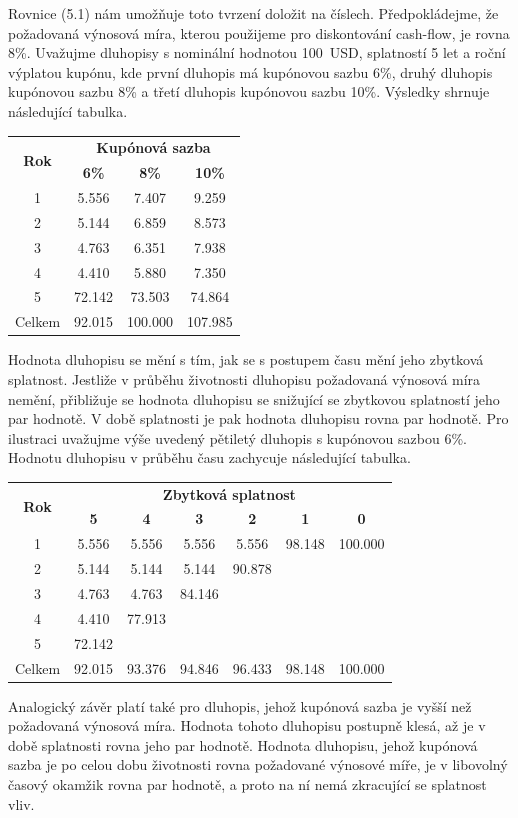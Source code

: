 \documentclass[a4paper]{book}
\begin{document}
Rovnice (5.1) nám umožňuje toto tvrzení doložit na číslech. Předpokládejme, že požadovaná výnosová míra, kterou použijeme pro diskontování cash-flow, je rovna 8\%. Uvažujme dluhopisy s nominální hodnotou 100~USD, splatností 5 let a roční výplatou kupónu, kde první dluhopis má kupónovou sazbu 6\%, druhý dluhopis kupónovou sazbu 8\% a třetí dluhopis kupónovou sazbu 10\%. Výsledky shrnuje následující tabulka.
\begin{center}
\begin{tabular}{c c c c}
\multirow{2}{*}{\textbf{Rok}} & \multicolumn{3}{c}{\textbf{Kupónová sazba}}\\
                              & \textbf{6\%} & \textbf{8\%} & \textbf{10\%}\\
\hline
1	&  5.556 &   7.407 &   9.259 \\
2	&  5.144 &   6.859 &   8.573 \\
3	&  4.763 &   6.351 &   7.938 \\
4	&  4.410 &   5.880 &   7.350 \\
5	& 72.142 &  73.503 &  74.864 \\
\hline
Celkem	& 92.015 & 100.000 & 107.985 \\

\end{tabular}
\end{center}

Hodnota dluhopisu se mění s tím, jak se s postupem času mění jeho zbytková splatnost. Jestliže v průběhu životnosti dluhopisu požadovaná výnosová míra nemění, přibližuje se hodnota dluhopisu se snižující se zbytkovou splatností jeho par hodnotě. V době splatnosti je pak hodnota dluhopisu rovna par hodnotě. Pro ilustraci uvažujme výše uvedený pětiletý dluhopis s kupónovou sazbou 6\%. Hodnotu dluhopisu v průběhu času zachycuje následující tabulka.
\begin{center}
\begin{tabular}{c c c c c c c}
\multirow{2}{*}{\textbf{Rok}} & \multicolumn{6}{c}{\textbf{Zbytková splatnost}}\\
                              & \textbf{5} & \textbf{4} & \textbf{3} & \textbf{2} & \textbf{1} & \textbf{0}\\
\hline
1	&  5.556 &  5.556 &  5.556 &  5.556 & 98.148 & 100.000 \\
2	&  5.144 &  5.144 &  5.144 & 90.878 &        &         \\
3	&  4.763 &  4.763 & 84.146 &        &        &         \\	
4	&  4.410 & 77.913 &        &        &        &         \\				
5	& 72.142 &        &        &        &        &         \\
Celkem  & 92.015 & 93.376 & 94.846 & 96.433 & 98.148 & 100.000
\end{tabular}
\end{center}
Analogický závěr platí také pro dluhopis, jehož kupónová sazba je vyšší než požadovaná výnosová míra. Hodnota tohoto dluhopisu postupně klesá, až je v době splatnosti rovna jeho par hodnotě. Hodnota dluhopisu, jehož kupónová sazba je po celou dobu životnosti rovna požadované výnosové míře, je v libovolný časový okamžik rovna par hodnotě, a proto na ní nemá zkracující se splatnost vliv.
\end{document}
